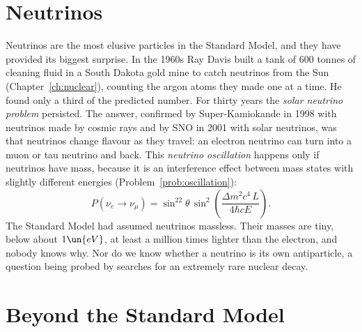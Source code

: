 \section{Neutrinos}

Neutrinos are the most elusive particles in the Standard Model, and they have provided its biggest surprise. In the 1960s Ray Davis built a tank of $600$ tonnes of cleaning fluid in a South Dakota gold mine to catch neutrinos from the Sun (Chapter~\ref{ch:nuclear}), counting the argon atoms they made one at a time. He found only a third of the predicted number. For thirty years the \emph{solar neutrino problem} persisted. The answer, confirmed by Super-Kamiokande in 1998 with neutrinos made by cosmic rays and by SNO in 2001 with solar neutrinos, was that neutrinos change flavour as they travel: an electron neutrino can turn into a muon or tau neutrino and back. This \emph{neutrino oscillation} happens only if neutrinos have mass, because it is an interference effect between mass states with slightly different energies (Problem~\ref{prob:oscillation}):
\[
  P(\nu_e\to\nu_\mu) = \sin^22\theta\,\sin^2\!\left(\frac{\Delta m^2c^4\,L}{4\hbar cE}\right).
\]
The Standard Model had assumed neutrinos massless. Their masses are tiny, below about $1\un{eV}$, at least a million times lighter than the electron, and nobody knows why. Nor do we know whether a neutrino is its own antiparticle, a question being probed by searches for an extremely rare nuclear decay.

\section{Beyond the Standard Model}

